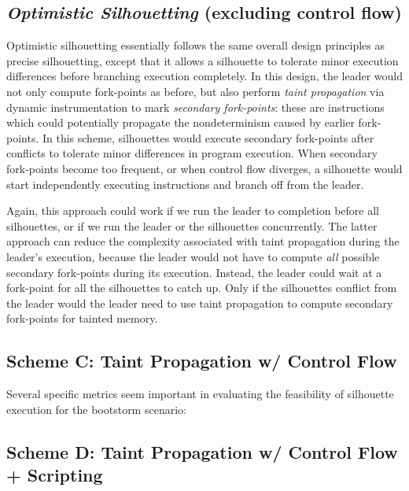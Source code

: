 \subsection{{\em Optimistic Silhouetting} (excluding control flow)}\label{opt:sil}
Optimistic silhouetting essentially follows the 
same overall design principles
as precise silhouetting,
except that it allows a silhouette
to tolerate minor execution differences 
before branching execution completely.
In this design, the leader would not only compute
fork-points as before, but also perform {\em taint propagation}
via dynamic instrumentation to 
mark {\em secondary fork-points}:
these are instructions which 
could potentially propagate the nondeterminism
caused by earlier fork-points.
In this scheme, silhouettes would 
execute secondary fork-points
after conflicts to tolerate
minor differences in program execution.
When secondary fork-points 
become too frequent, or when
control flow diverges,
a silhouette would start
independently executing instructions
and branch off from the leader.

Again, this approach
could work if we run the leader to completion
before all silhouettes, or if we
run the leader or the silhouettes
concurrently. The latter
approach can reduce the complexity
associated with taint propagation
during the leader's execution,
because the leader would
not have to compute
{\em all} possible secondary fork-points
during its execution. 
Instead, the leader could wait at 
a fork-point for all the silhouettes
to catch up. Only if the silhouettes
conflict from the leader would
the leader need to use taint propagation
to compute secondary fork-points
for tainted memory.

\subsection{Scheme C: Taint Propagation w/ Control Flow}\label{precise:sil}

Several specific metrics seem important in
evaluating the feasibility of silhouette
execution for the bootstorm scenario:


\subsection{Scheme D: Taint Propagation w/ Control Flow + Scripting}\label{precise:sil}

